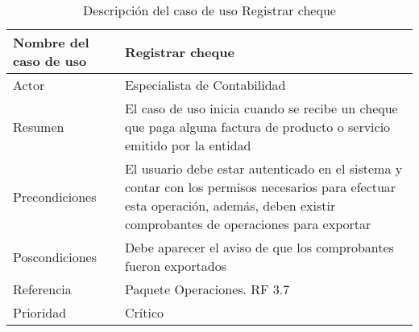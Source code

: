 \begin{table}[H]
	\sf
	\begin{supertabular}{|p{4.5cm}|p{12cm}|}
		\hline
		\textbf{Nombre del caso de uso}
		& \textbf{Registrar cheque} \\ \hline
		
		Actor
		& Especialista de Contabilidad \\ \hline
		
		Resumen
		& El caso de uso inicia cuando se recibe un cheque que paga alguna factura de producto o servicio emitido por la entidad \\ \hline
		
		Precondiciones
		& El usuario debe estar autenticado en el sistema y contar con los permisos necesarios para efectuar esta operación, además, deben existir comprobantes de operaciones para exportar \\ \hline
		
		Poscondiciones
		& Debe aparecer el aviso de que los comprobantes fueron exportados \\ \hline
		
		Referencia
		& Paquete Operaciones. RF 3.7 \\ \hline
		
		Prioridad
		& Crítico \\		
		\hline
	\end{supertabular}
	\caption[Descripción del caso de uso Registrar cheque]{Descripción del caso de uso Registrar cheque}
	\label{table:CU_RegistCheque}
\end{table}

